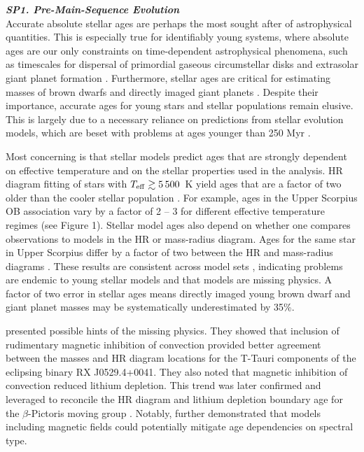 \documentclass[12pt,a4paper]{article}
\begin{document}
\textbf{\textit{SP1. Pre-Main-Sequence Evolution}} \\
Accurate absolute stellar ages are perhaps the most sought after of astrophysical quantities. This is especially true for identifiably young systems, where absolute ages are our only constraints on time-dependent astrophysical phenomena, such as timescales for dispersal of primordial gaseous circumstellar disks \citep{Haisch2001,Mamajek2009} and extrasolar giant planet formation \citep{Chabrier2014}. Furthermore, stellar ages are critical for estimating  masses of brown dwarfs and directly imaged giant planets \citep{Kalas2008}. Despite their importance, accurate ages for young stars and stellar populations remain elusive. This is largely due to a necessary reliance on predictions from stellar evolution models, which are beset with problems at ages younger than 250 Myr \citep{Soderblom2014,Stassun2014}. 

Most concerning is that stellar models predict ages that are strongly dependent on effective temperature and on the stellar properties used in the analysis. HR diagram fitting of stars with $T_{\rm eff} \gtrsim 5\,500$~K yield ages that are a factor of two older than the cooler stellar population \citep{Naylor2009, Herczeg2015}. For example, ages in the Upper Scorpius OB association vary by a factor of 2 -- 3 for different effective temperature regimes (see Figure 1). Stellar model ages also depend on whether one compares observations to models in the HR or mass-radius diagram. Ages for the same star in Upper Scorpius differ by a factor of two between the HR and mass-radius diagrams \citep{Kraus2015}. These results are consistent across model sets \citep{Herczeg2015}, indicating problems are endemic to young stellar models and that models are missing physics. A factor of two error in stellar ages means directly imaged young brown dwarf and giant planet masses may be systematically underestimated by 35\%. %

\citet{DAntona2000} presented possible hints of the missing physics. They showed that inclusion of rudimentary magnetic inhibition of convection provided better agreement between the masses and HR diagram locations for the T-Tauri components of the eclipsing binary RX J0529.4+0041. They also noted that magnetic inhibition of convection reduced lithium depletion. This trend was later confirmed and leveraged to reconcile the HR diagram and lithium depletion boundary age for the $\beta$-Pictoris moving group \citep{MM10, Malo2014}. Notably, \citet{Malo2014} further demonstrated that models including magnetic fields could potentially mitigate age dependencies on spectral type.
\end{document}
